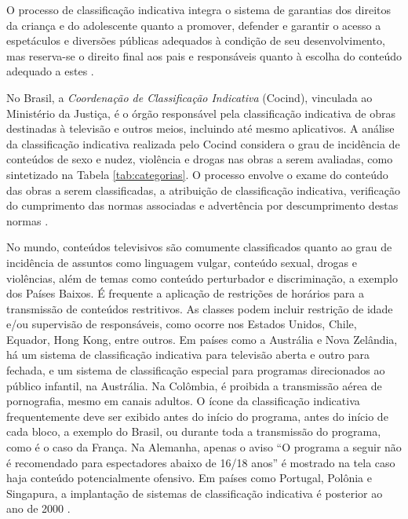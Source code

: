 
O processo de classificação indicativa integra o sistema de garantias dos direitos da criança e do adolescente quanto a promover, defender e garantir o acesso a espetáculos e diversões públicas adequados à condição de seu desenvolvimento, mas reserva-se o direito final aos pais e responsáveis quanto à escolha do conteúdo adequado a estes \cite{eca}.




No Brasil, a \emph{Coordenação de Classificação Indicativa} (Cocind), vinculada ao Ministério da Justiça, é o órgão responsável pela classificação indicativa de obras destinadas à televisão e outros meios, incluindo até mesmo aplicativos. A análise da classificação indicativa realizada pelo Cocind considera o grau de incidência de conteúdos de sexo e nudez, violência e drogas nas obras a serem avaliadas, como sintetizado na Tabela \ref{tab:categorias}. O processo envolve o exame do conteúdo das obras a serem classificadas, a atribuição de classificação indicativa, verificação do cumprimento das normas associadas e advertência por descumprimento destas normas \cite{portaria:ci}.

No mundo, conteúdos televisivos são comumente classificados quanto ao grau de incidência de assuntos como linguagem vulgar, conteúdo sexual, drogas e violências, além de temas como conteúdo perturbador e discriminação, a exemplo dos Países Baixos. É frequente a aplicação de restrições de horários para a transmissão de conteúdos restritivos. As classes podem incluir restrição de idade e/ou supervisão de responsáveis, como ocorre nos Estados Unidos, Chile, Equador, Hong Kong, entre outros. Em países como a Austrália e Nova Zelândia, há um sistema de classificação indicativa para televisão aberta e outro para fechada, e um sistema de classificação especial para programas direcionados ao público infantil, na Austrália. Na Colômbia, é proibida a transmissão aérea de pornografia, mesmo em canais adultos. O ícone da classificação indicativa frequentemente deve ser exibido antes do início do programa, antes do início de cada bloco, a exemplo do Brasil, ou durante toda a transmissão do programa, como é o caso da França.  Na Alemanha, apenas o aviso ``O programa a seguir não é recomendado para espectadores abaixo de 16/18 anos'' é mostrado na tela caso haja conteúdo potencialmente ofensivo. Em países como Portugal, Polônia e Singapura, a implantação de sistemas de classificação indicativa é posterior ao ano de 2000 \cite{televisioncontentwiki}.
